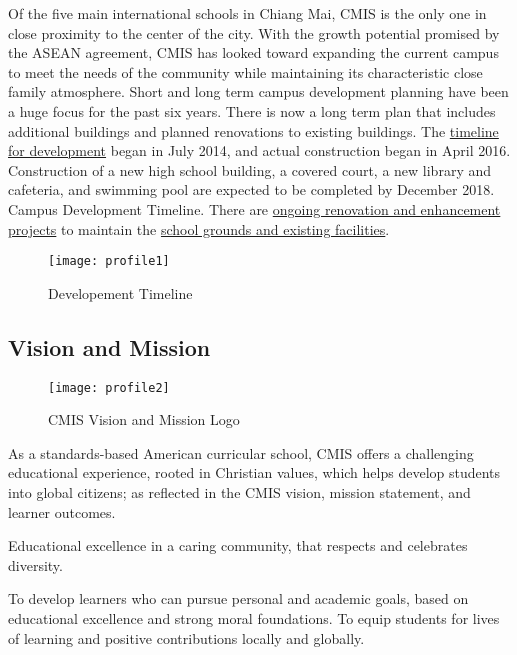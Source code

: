 
Of the five main international schools in Chiang Mai, CMIS is the only one in close proximity to the center of the city.  With the growth potential promised by the ASEAN agreement, CMIS has looked toward expanding the current campus to meet the needs of the community while maintaining its characteristic close family atmosphere.  Short and long term campus development planning have been a huge focus for the past six years. There is now a long term plan that includes additional buildings and planned renovations to existing buildings.  The \href{https://docs.google.com/spreadsheets/d/12H8OtZlda_OBTVfUOYvEg0qghC6U9Xz93vGASmJF1hQ/edit#gid=0}{timeline for development} began in July 2014, and actual construction began in April 2016.  Construction of a new high school building, a covered court, a new library and cafeteria, and swimming pool are expected to be completed by December 2018.  Campus Development Timeline.  There are \href{https://docs.google.com/presentation/d/1o_AcPdYb1572Wbm7vk79ssg7RzkQykBGOqrKGVhTArw/edit#slide=id.ga51c5f54b_0_41}{ongoing renovation and enhancement projects} to maintain the \href{https://docs.google.com/presentation/d/1BSJvdHXlQ7o2US1hnvFOyPIcvA3WEPCRc9XYJAqlNt4/edit#slide=id.g540d23d42_034}{school grounds and existing facilities}.

\begin{figure}
\centering
\texttt{[image: profile1]}
\caption{Developement Timeline}
\end{figure}

\subsection{Vision and Mission}

\begin{figure}
\centering
\texttt{[image: profile2]}
\caption{CMIS Vision and Mission Logo}
\end{figure}

As a standards-based American curricular school, CMIS offers a challenging educational experience, rooted in Christian values, which helps develop students into global citizens; as reflected in the CMIS vision, mission statement, and learner outcomes.

Educational excellence in a caring community, that respects and celebrates diversity.

To develop learners who can pursue personal and academic goals, based on educational excellence and strong moral foundations. To equip students for lives of learning and positive contributions locally and globally.

